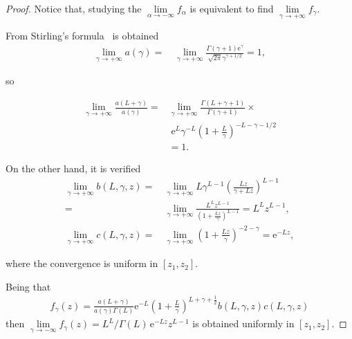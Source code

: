 \documentclass[journal]{IEEEtran}
\numberwithin{equation}{section}
\newenvironment{dem}[1][Proof]{\begin{proof}[{\it #1}]}{\end{proof}}
\newcommand{\e}{\mathrm{e}}
\newcommand{\al}{&\,}
\newcommand{\pa}[1]{\ensuremath{\left( #1 \right)}}
\begin{document}
\begin{dem}
	Notice that, studying the $\lim\limits_{\alpha\to-\infty} f_{\alpha}$ is equivalent to find
	$\lim\limits_{\gamma\to+\infty} f_{\gamma}.$

	
From Stirling's formula~\cite{abramowitz1964} is obtained
\begin{align*}
\lim_{\gamma\to+\infty} a\pa{\gamma} = 
\al \lim_{\gamma\to+\infty}\frac{\Gamma\pa{\gamma+1}\e^{\gamma}}{\sqrt{2\pi}\gamma^{\gamma+1/2}} = 1,
\end{align*}
	
so
	
\begin{align*}
\lim_{\gamma\to+\infty} \frac{a\pa{L+\gamma}}{a\pa{\gamma}} = &
\lim_{\gamma\to+\infty}\frac{\Gamma\pa{L+\gamma+1}}{\Gamma\pa{\gamma+1}}\times\\
& \; \e^{L}\gamma^{-L}\pa{1+\frac{L}{\gamma}}^{-L-\gamma-1/2} \\
&= 1.
\end{align*}

On the other hand, it is verified 
\begin{align*}
\lim_{\gamma\to+\infty} b\pa{L,\gamma,z} =
\al \lim_{\gamma\to+\infty}L\gamma^{L-1}\pa{\frac{Lz}{\gamma+Lz}}^{L-1} \\
= \al \lim_{\gamma\to+\infty} \frac{L^{L} z^{L-1}}{\pa{1+\frac{Lz}{\gamma}}^{L-1}} = L^{L} z^{L-1},\\
\lim_{\gamma\to+\infty} c\pa{L,\gamma,z} = \al \lim_{\gamma\to+\infty}\pa{1+\frac{Lz}{\gamma}}^{-2-\gamma} = \e^{-Lz},
\end{align*}
	
where the convergence is uniform in $[z_{1},z_{2}]$.
	
Being that
\begin{align*}
f_{\gamma}\pa{z} = \frac{a\pa{L+\gamma}}{a\pa{\gamma}\Gamma\pa{L}}\e^{-L}\pa{1+\frac{L}{\gamma}}^{L+\gamma+\frac 1 2}
b\pa{L,\gamma,z}c\pa{L,\gamma,z}
\end{align*}
	then $\lim\limits_{\gamma\to-\infty} f_{\gamma}\pa{z} = L^{L}/\Gamma\pa{L}\,\e^{-Lz}z^{L-1}$
	is obtained uniformly in $[z_{1},z_{2}]$.
\end{dem}
\end{document}
